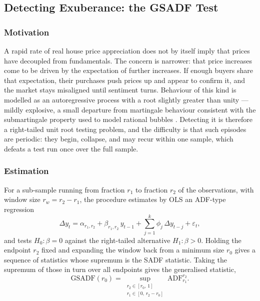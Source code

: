 \subsection{Detecting Exuberance: the GSADF Test}
\label{subsec:gsadf}

\subsubsection{Motivation}

A rapid rate of real house price appreciation does not by itself imply that
prices have decoupled from fundamentals. The concern is narrower: that price
increases come to be driven by the expectation of further increases. If
enough buyers share that expectation, their purchases push prices up and
appear to confirm it, and the market stays misaligned until sentiment turns.
Behaviour of this kind is modelled as an autoregressive process with a root
slightly greater than unity --- mildly explosive, a small departure from
martingale behaviour consistent with the submartingale property used to model
rational bubbles \citep{phillips2015a, phillips2015b}. Detecting it is
therefore a right-tailed unit root testing problem, and the difficulty is
that such episodes are periodic: they begin, collapse, and may recur within
one sample, which defeats a test run once over the full sample.

\subsubsection{Estimation}

For a sub-sample running from fraction $r_1$ to fraction $r_2$ of the
observations, with window size $r_w = r_2 - r_1$, the procedure estimates by
OLS an ADF-type regression
\begin{equation}
  \label{eq:adf}
  \Delta y_t = \alpha_{r_1, r_2}
             + \beta_{r_1, r_2}\, y_{t-1}
             + \sum_{j=1}^{k} \phi_j\, \Delta y_{t-j}
             + \varepsilon_t ,
\end{equation}
and tests $H_0\colon \beta = 0$ against the right-tailed alternative
$H_1\colon \beta > 0$. Holding the endpoint $r_2$ fixed and expanding the
window back from a minimum size $r_0$ gives a sequence of statistics whose
supremum is the SADF statistic. Taking the supremum of those in turn over all
endpoints gives the generalised statistic,
\begin{equation}
  \label{eq:gsadf}
  \mathrm{GSADF}(r_0) = \sup_{\substack{r_2 \in [r_0,\, 1] \\
                                        r_1 \in [0,\, r_2 - r_0]}}
                        \mathrm{ADF}_{r_1}^{r_2}.
\end{equation}

